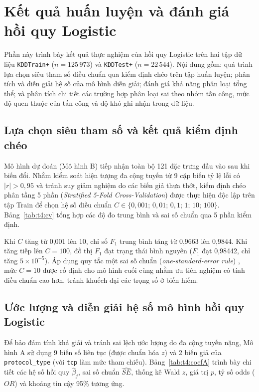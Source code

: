 \documentclass[../main.tex]{subfiles}
\begin{document}
\section{Kết quả huấn luyện và đánh giá hồi quy Logistic}
\label{sec:t4:result}

Phần này trình bày kết quả thực nghiệm của hồi quy Logistic trên hai tập dữ liệu \texttt{KDDTrain+} ($n=125\,973$) và \texttt{KDDTest+} ($n=22\,544$). Nội dung gồm: quá trình lựa chọn siêu tham số điều chuẩn qua kiểm định chéo trên tập huấn luyện; phân tích và diễn giải hệ số của mô hình diễn giải; đánh giá khả năng phân loại tổng thể; và phân tích chi tiết các trường hợp phân loại sai theo nhóm tấn công, mức độ quen thuộc của tấn công và độ khó ghi nhận trong dữ liệu.

\subsection{Lựa chọn siêu tham số và kết quả kiểm định chéo}
Mô hình dự đoán (Mô hình B) tiếp nhận toàn bộ 121 đặc trưng đầu vào sau khi biến đổi. Nhằm kiểm soát hiện tượng đa cộng tuyến từ 9 cặp biến tỷ lệ lỗi có $|r|>0{,}95$ và tránh suy giảm nghiệm do các biến giả thưa thớt, kiểm định chéo phân tầng 5 phần (\textit{Stratified 5-Fold Cross-Validation}) được thực hiện độc lập trên tập Train để chọn hệ số điều chuẩn $C\in\{0{,}001;\,0{,}01;\,0{,}1;\,1;\,10;\,100\}$. Bảng~\ref{tab:t4:cv} tổng hợp các độ đo trung bình và sai số chuẩn qua 5 phần kiểm định.

Khi $C$ tăng từ 0,001 lên 10, chỉ số $F_1$ trung bình tăng từ 0,9663 lên 0,9844. Khi tăng tiếp lên $C=100$, đồ thị $F_1$ đạt trạng thái bình nguyên ($F_1$ đạt 0,98442, chỉ tăng $5\times 10^{-5}$). Áp dụng quy tắc một sai số chuẩn (\textit{one-standard-error rule}) \cite{task4_hastie2009}, mức $C=10$ được cố định cho mô hình cuối cùng nhằm ưu tiên nghiệm có tính điều chuẩn cao hơn, tránh khuếch đại các trọng số ở biến hiếm.

\subsection{Ước lượng và diễn giải hệ số mô hình hồi quy Logistic}
Để bảo đảm tính khả giải và tránh sai lệch ước lượng do đa cộng tuyến nặng, Mô hình A sử dụng 9 biến số liên tục (được chuẩn hóa $z$) và 2 biến giả của \texttt{protocol\_type} (với \texttt{tcp} làm mức tham chiếu). Bảng~\ref{tab:t4:coefA} trình bày chi tiết các hệ số hồi quy $\hat\beta_j$, sai số chuẩn $\widehat{SE}$, thống kê Wald $z$, giá trị $p$, tỷ số odds ($OR$) và khoảng tin cậy 95\% tương ứng.
\end{document}
